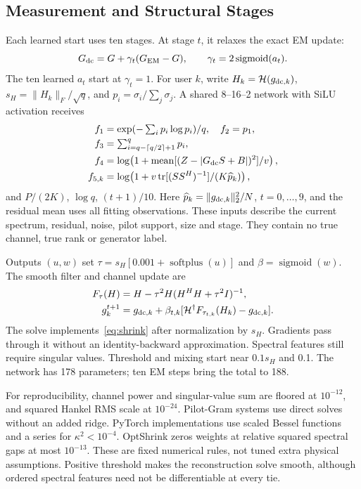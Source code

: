 \documentclass[10pt,journal,letterpaper]{IEEEtran}
\newcommand{\HH}{\mathcal{H}}
\DeclareMathOperator{\tr}{tr}
\DeclareMathOperator{\sigmoid}{sigmoid}
\DeclareMathOperator{\softplus}{softplus}
\begin{document}
\subsection{Measurement and Structural Stages}
Each learned start uses ten stages. At stage $t$, it relaxes the exact EM update:
\begin{equation}
 G_{\rm dc}=G+\gamma_t(G_{\rm EM}-G),\qquad
 \gamma_t=2\sigmoid(a_t).
\end{equation}
The ten learned $a_t$ start at $\gamma_t=1$. For user $k$, write $H_k=\HH(g_{{\rm dc},k})$, $s_H=\|H_k\|_F/\sqrt q$, and $p_i=\sigma_i/\sum_j\sigma_j$. A shared 8--16--2 network with SiLU activation receives
\begin{align}
 f_1&=\exp(-\textstyle\sum_i p_i\log p_i)/q,\quad f_2=p_1,\nonumber\\
 f_3&=\textstyle\sum_{i=q-\lceil q/2\rceil+1}^q p_i,\nonumber\\
 f_4&=\log\!\left(1+\operatorname{mean}[(Z-|G_{\rm dc}S+B|)^2]/v\right),\nonumber\\
 f_{5,k}&=\log\!\left(1+v\tr[(SS^H)^{-1}]/(K\widehat p_k)\right),
 \label{eq:features}
\end{align}
and $P/(2K)$, $\log q$, $(t+1)/10$. Here $\widehat p_k=\|g_{{\rm dc},k}\|_2^2/N$, $t=0,\ldots,9$, and the residual mean uses all fitting observations. These inputs describe the current spectrum, residual, noise, pilot support, size and stage. They contain no true channel, true rank or generator label.

Outputs $(u,w)$ set $\tau=s_H[0.001+\softplus(u)]$ and $\beta=\sigmoid(w)$. The smooth filter and channel update are
\begin{align}
 F_\tau(H)&=H-\tau^2H(H^HH+\tau^2I)^{-1},\label{eq:solve}\\
 g_k^{t+1}&=g_{{\rm dc},k}+\beta_{t,k}
 [\HH^\dagger F_{\tau_{t,k}}(H_k)-g_{{\rm dc},k}].
\end{align}
The solve implements~\eqref{eq:shrink} after normalization by $s_H$. Gradients pass through it without an identity-backward approximation. Spectral features still require singular values. Threshold and mixing start near $0.1s_H$ and 0.1. The network has 178 parameters; ten EM steps bring the total to 188.

For reproducibility, channel power and singular-value sum are floored at $10^{-12}$, and squared Hankel RMS scale at $10^{-24}$. Pilot-Gram systems use direct solves without an added ridge. PyTorch implementations use scaled Bessel functions and a series for $\kappa^2<10^{-4}$. OptShrink zeros weights at relative squared spectral gaps at most $10^{-13}$. These are fixed numerical rules, not tuned extra physical assumptions. Positive threshold makes the reconstruction solve smooth, although ordered spectral features need not be differentiable at every tie.
\end{document}
